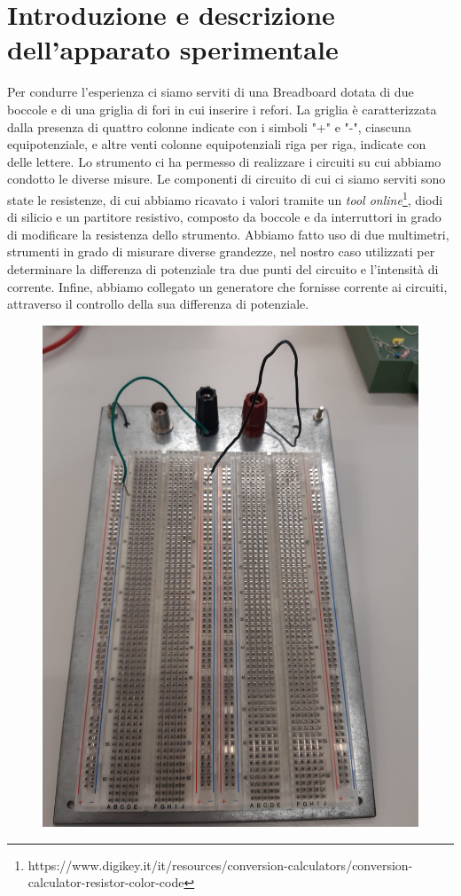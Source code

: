 \section{Introduzione e descrizione dell'apparato sperimentale}
Per condurre l'esperienza ci siamo serviti di una Breadboard dotata di due boccole e di una griglia di fori in cui inserire i refori. La griglia è caratterizzata dalla presenza di quattro colonne indicate con i simboli "+" e "-", ciascuna equipotenziale, e altre venti colonne equipotenziali riga per riga, indicate con delle lettere. Lo strumento ci ha permesso di realizzare i circuiti su cui abbiamo condotto le diverse misure. Le componenti di circuito di cui ci siamo serviti sono state le resistenze, di cui abbiamo ricavato i valori tramite un \textit{tool online}\footnote{ https://www.digikey.it/it/resources/conversion-calculators/conversion-calculator-resistor-color-code}, diodi di silicio e un partitore resistivo, composto da boccole e da interruttori in grado di modificare la resistenza dello strumento.
Abbiamo fatto uso di due multimetri, strumenti in grado di misurare diverse grandezze, nel nostro caso utilizzati per determinare la differenza di potenziale tra due punti del circuito e l'intensità di corrente.
Infine, abbiamo collegato un generatore che fornisse corrente ai circuiti, attraverso il controllo della sua differenza di potenziale.

\begin{figure}[h!]
    \centering
    \includegraphics[scale=0.1]{Immagini/Circuitoooo.jpeg}
    \label{fig:my_label}
\end{figure}


